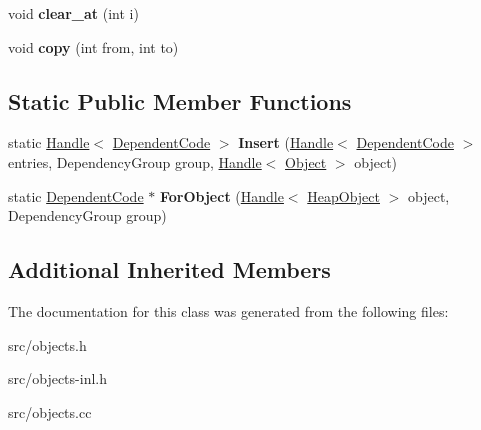 \begin{DoxyCompactItemize}
\item 
\hypertarget{classv8_1_1internal_1_1_dependent_code_a0b3afc1373869425880b23a13a434372}{}void {\bfseries clear\+\_\+at} (int i)\label{classv8_1_1internal_1_1_dependent_code_a0b3afc1373869425880b23a13a434372}

\item 
\hypertarget{classv8_1_1internal_1_1_dependent_code_aea3012f66cd29269db756ce10f1900d5}{}void {\bfseries copy} (int from, int to)\label{classv8_1_1internal_1_1_dependent_code_aea3012f66cd29269db756ce10f1900d5}

\end{DoxyCompactItemize}
\subsection*{Static Public Member Functions}
\begin{DoxyCompactItemize}
\item 
\hypertarget{classv8_1_1internal_1_1_dependent_code_a23717ee6c4ba14388e055eb1e6f874b6}{}static \hyperlink{classv8_1_1internal_1_1_handle}{Handle}$<$ \hyperlink{classv8_1_1internal_1_1_dependent_code}{Dependent\+Code} $>$ {\bfseries Insert} (\hyperlink{classv8_1_1internal_1_1_handle}{Handle}$<$ \hyperlink{classv8_1_1internal_1_1_dependent_code}{Dependent\+Code} $>$ entries, Dependency\+Group group, \hyperlink{classv8_1_1internal_1_1_handle}{Handle}$<$ \hyperlink{classv8_1_1internal_1_1_object}{Object} $>$ object)\label{classv8_1_1internal_1_1_dependent_code_a23717ee6c4ba14388e055eb1e6f874b6}

\item 
\hypertarget{classv8_1_1internal_1_1_dependent_code_ab16952c5ac8db22e9c69d5a2fe8c0a72}{}static \hyperlink{classv8_1_1internal_1_1_dependent_code}{Dependent\+Code} $\ast$ {\bfseries For\+Object} (\hyperlink{classv8_1_1internal_1_1_handle}{Handle}$<$ \hyperlink{classv8_1_1internal_1_1_heap_object}{Heap\+Object} $>$ object, Dependency\+Group group)\label{classv8_1_1internal_1_1_dependent_code_ab16952c5ac8db22e9c69d5a2fe8c0a72}

\end{DoxyCompactItemize}
\subsection*{Additional Inherited Members}


The documentation for this class was generated from the following files\+:\begin{DoxyCompactItemize}
\item 
src/objects.\+h\item 
src/objects-\/inl.\+h\item 
src/objects.\+cc\end{DoxyCompactItemize}
